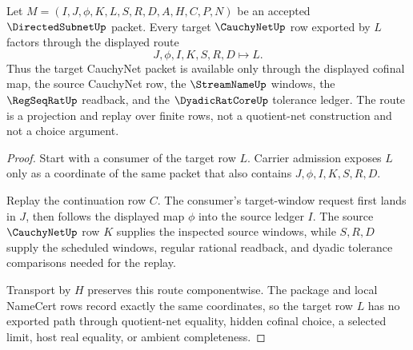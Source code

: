 \begin{theorem}
\label{thm:directed-subnet-cauchynet-handoff}
Let $M=(I,J,\phi,K,L,S,R,D,A,H,C,P,N)$ be an accepted $\DirectedSubnetUp$ packet. Every target $\CauchyNetUp$ row exported by $L$ factors through the displayed route
$$
J,\phi,I,K,S,R,D \longmapsto L .
$$
Thus the target CauchyNet packet is available only through the displayed cofinal map, the source CauchyNet row, the $\StreamNameUp$ windows, the $\RegSeqRatUp$ readback, and the $\DyadicRatCoreUp$ tolerance ledger. The route is a projection and replay over finite rows, not a quotient-net construction and not a choice argument.
\end{theorem}
\begin{proof}
Start with a consumer of the target row $L$. Carrier admission exposes $L$ only as a coordinate of the same packet that also contains $J,\phi,I,K,S,R,D$.

Replay the continuation row $C$. The consumer's target-window request first lands in $J$, then follows the displayed map $\phi$ into the source ledger $I$. The source $\CauchyNetUp$ row $K$ supplies the inspected source windows, while $S,R,D$ supply the scheduled windows, regular rational readback, and dyadic tolerance comparisons needed for the replay.

Transport by $H$ preserves this route componentwise. The package and local NameCert rows record exactly the same coordinates, so the target row $L$ has no exported path through quotient-net equality, hidden cofinal choice, a selected limit, host real equality, or ambient completeness.
\end{proof}

